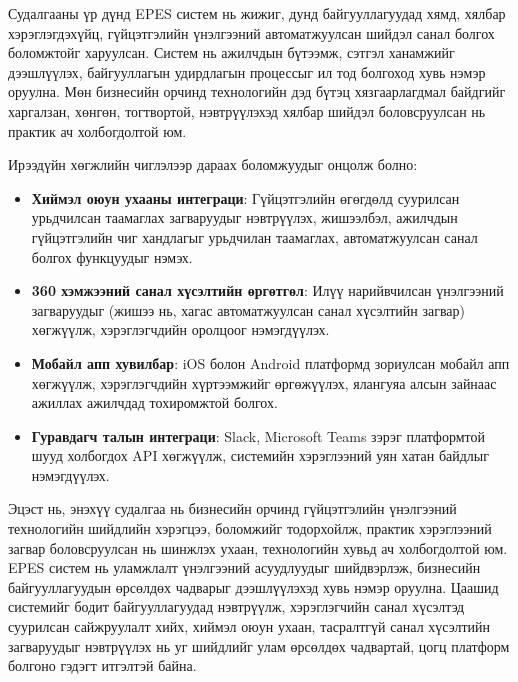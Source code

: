 Судалгааны үр дүнд EPES систем нь жижиг, дунд байгууллагуудад хямд, хялбар хэрэглэгдэхүйц, гүйцэтгэлийн үнэлгээний автоматжуулсан 
шийдэл санал болгох боломжтойг харуулсан. Систем нь ажилчдын бүтээмж, сэтгэл ханамжийг дээшлүүлэх, байгууллагын удирдлагын процессыг ил тод 
болгоход хувь нэмэр оруулна. Мөн бизнесийн орчинд технологийн дэд бүтэц хязгаарлагдмал байдгийг харгалзан, хөнгөн, тогтвортой, 
нэвтрүүлэхэд хялбар шийдэл боловсруулсан нь практик ач холбогдолтой юм.

Ирээдүйн хөгжлийн чиглэлээр дараах боломжуудыг онцолж болно:
\begin{itemize}
    \item \textbf{Хиймэл оюун ухааны интеграци}: Гүйцэтгэлийн өгөгдөлд суурилсан урьдчилсан таамаглах загваруудыг нэвтрүүлэх, жишээлбэл, 
    ажилчдын гүйцэтгэлийн чиг хандлагыг урьдчилан таамаглах, автоматжуулсан санал болгох функцуудыг нэмэх.
    \item \textbf{360 хэмжээний санал хүсэлтийн өргөтгөл}: Илүү нарийвчилсан үнэлгээний загваруудыг (жишээ нь, хагас автоматжуулсан санал хүсэлтийн загвар) хөгжүүлж, хэрэглэгчдийн оролцоог нэмэгдүүлэх.
    \item \textbf{Мобайл апп хувилбар}: iOS болон Android платформд зориулсан мобайл апп хөгжүүлж, хэрэглэгчдийн хүртээмжийг өргөжүүлэх, ялангуяа алсын зайнаас ажиллах ажилчдад тохиромжтой болгох.
    \item \textbf{Гуравдагч талын интеграци}: Slack, Microsoft Teams зэрэг платформтой шууд холбогдох API хөгжүүлж, системийн хэрэглээний уян хатан байдлыг нэмэгдүүлэх.
\end{itemize}

Эцэст нь, энэхүү судалгаа нь бизнесийн орчинд гүйцэтгэлийн үнэлгээний технологийн шийдлийн хэрэгцээ, боломжийг тодорхойлж, 
практик хэрэглээний загвар боловсруулсан нь шинжлэх ухаан, технологийн хувьд ач холбогдолтой юм. EPES систем нь уламжлалт үнэлгээний 
асуудлуудыг шийдвэрлэж, бизнесийн байгууллагуудын өрсөлдөх чадварыг дээшлүүлэхэд хувь нэмэр оруулна. Цаашид системийг бодит байгууллагуудад 
нэвтрүүлж, хэрэглэгчийн санал хүсэлтэд суурилсан сайжруулалт хийх, хиймэл оюун ухаан, тасралтгүй санал хүсэлтийн загваруудыг нэвтрүүлэх нь уг 
шийдлийг улам өрсөлдөх чадвартай, цогц платформ болгоно гэдэгт итгэлтэй байна.